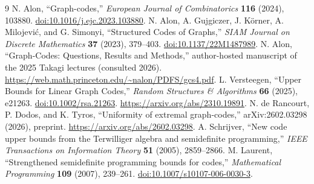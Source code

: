 \documentclass[11pt,a4paper]{article}
\begin{document}
\begin{thebibliography}{9}
 N. Alon, ``Graph-codes,'' \emph{European Journal of Combinatorics} \textbf{116} (2024), 103880. \href{https://doi.org/10.1016/j.ejc.2023.103880}{doi:10.1016/j.ejc.2023.103880}.
 N. Alon, A. Gujgiczer, J. K\"orner, A. Milojevi\'c, and G. Simonyi, ``Structured Codes of Graphs,'' \emph{SIAM Journal on Discrete Mathematics} \textbf{37} (2023), 379--403. \href{https://doi.org/10.1137/22M1487989}{doi:10.1137/22M1487989}.
 N. Alon, ``Graph-Codes: Questions, Results and Methods,'' author-hosted manuscript of the 2025 Takagi lectures (consulted 2026). \url{https://web.math.princeton.edu/~nalon/PDFS/gcs4.pdf}.
 L. Versteegen, ``Upper Bounds for Linear Graph Codes,'' \emph{Random Structures \& Algorithms} \textbf{66} (2025), e21263. \href{https://doi.org/10.1002/rsa.21263}{doi:10.1002/rsa.21263}. \url{https://arxiv.org/abs/2310.19891}.
 N. de Rancourt, P. Dodos, and K. Tyros, ``Uniformity of extremal graph-codes,'' arXiv:2602.03298 (2026), preprint. \url{https://arxiv.org/abs/2602.03298}.
 A. Schrijver, ``New code upper bounds from the Terwilliger algebra and semidefinite programming,'' \emph{IEEE Transactions on Information Theory} \textbf{51} (2005), 2859--2866.
 M. Laurent, ``Strengthened semidefinite programming bounds for codes,'' \emph{Mathematical Programming} \textbf{109} (2007), 239--261. \href{https://doi.org/10.1007/s10107-006-0030-3}{doi:10.1007/s10107-006-0030-3}.
\end{thebibliography}
\end{document}
